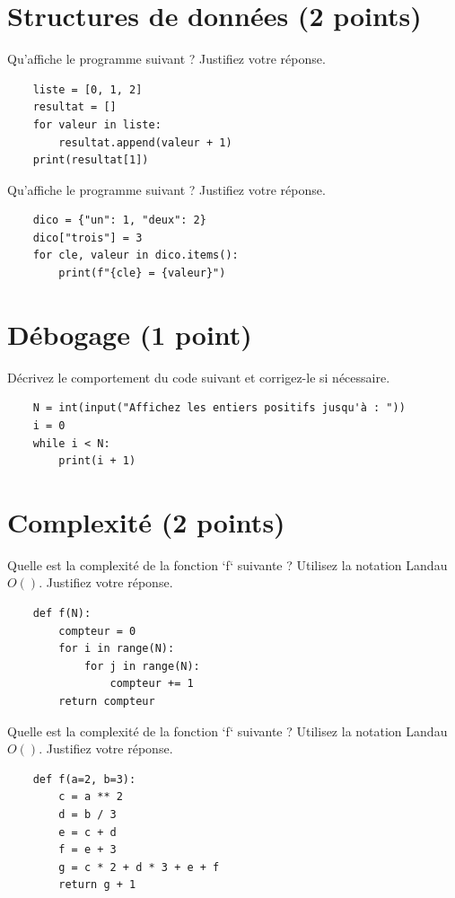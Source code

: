 \documentclass{exam}
\begin{document}
\section{Structures de données \small{(2 points)}}
\begin{questions}
    \question Qu'affiche le programme suivant ? Justifiez votre réponse.
    \begin{verbatim}
    liste = [0, 1, 2]
    resultat = []
    for valeur in liste:
        resultat.append(valeur + 1)
    print(resultat[1])
    \end{verbatim}
    \vspace*{1cm}

    \question Qu'affiche le programme suivant ? Justifiez votre réponse.
    \begin{verbatim}
    dico = {"un": 1, "deux": 2}
    dico["trois"] = 3
    for cle, valeur in dico.items():
        print(f"{cle} = {valeur}")
    \end{verbatim}
    \vspace*{1cm}
\end{questions}

\section{Débogage \small{(1 point)}}
\begin{questions}
    \question Décrivez le comportement du code suivant et corrigez-le si nécessaire.
    \begin{verbatim}
    N = int(input("Affichez les entiers positifs jusqu'à : "))
    i = 0
    while i < N:
        print(i + 1)
    \end{verbatim}
    \vspace*{1cm}
\end{questions}

\section{Complexité \small{(2 points)}}
\begin{questions}
    \question Quelle est la complexité de la fonction `f` suivante ? Utilisez la notation Landau $O()$. Justifiez votre réponse.
    \begin{verbatim}
    def f(N):
        compteur = 0
        for i in range(N):
            for j in range(N):
                compteur += 1
        return compteur
    \end{verbatim}
    \vspace*{1cm}

    \question Quelle est la complexité de la fonction `f` suivante ? Utilisez la notation Landau $O()$. Justifiez votre réponse.
    \begin{verbatim}
    def f(a=2, b=3):
        c = a ** 2
        d = b / 3
        e = c + d
        f = e + 3
        g = c * 2 + d * 3 + e + f
        return g + 1
    \end{verbatim}
    \vspace*{1cm}
\end{questions}
\end{document}
